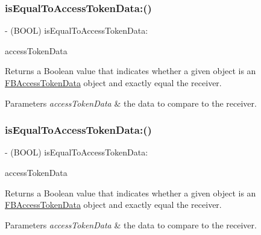 \subsubsection{\texorpdfstring{is\+Equal\+To\+Access\+Token\+Data\+:()}{isEqualToAccessTokenData:()}\hspace{0.1cm}{\footnotesize\ttfamily [1/5]}}
{\footnotesize\ttfamily -\/ (B\+O\+OL) is\+Equal\+To\+Access\+Token\+Data\+: \begin{DoxyParamCaption}\item[{(\hyperlink{interfaceFBAccessTokenData}{F\+B\+Access\+Token\+Data} $\ast$)}]{access\+Token\+Data }\end{DoxyParamCaption}}

Returns a Boolean value that indicates whether a given object is an \hyperlink{interfaceFBAccessTokenData}{F\+B\+Access\+Token\+Data} object and exactly equal the receiver.


\begin{DoxyParams}{Parameters}
{\em access\+Token\+Data} & the data to compare to the receiver. \\
\hline
\end{DoxyParams}
\mbox{\label{interfaceFBAccessTokenData_ac4da9dbf9d0c3c0bceb2d6b93cd764e2}} 
\subsubsection{\texorpdfstring{is\+Equal\+To\+Access\+Token\+Data\+:()}{isEqualToAccessTokenData:()}\hspace{0.1cm}{\footnotesize\ttfamily [2/5]}}
{\footnotesize\ttfamily -\/ (B\+O\+OL) is\+Equal\+To\+Access\+Token\+Data\+: \begin{DoxyParamCaption}\item[{(\hyperlink{interfaceFBAccessTokenData}{F\+B\+Access\+Token\+Data} $\ast$)}]{access\+Token\+Data }\end{DoxyParamCaption}}

Returns a Boolean value that indicates whether a given object is an \hyperlink{interfaceFBAccessTokenData}{F\+B\+Access\+Token\+Data} object and exactly equal the receiver.


\begin{DoxyParams}{Parameters}
{\em access\+Token\+Data} & the data to compare to the receiver. \\
\hline
\end{DoxyParams}
\mbox{\label{interfaceFBAccessTokenData_ac4da9dbf9d0c3c0bceb2d6b93cd764e2}} 
